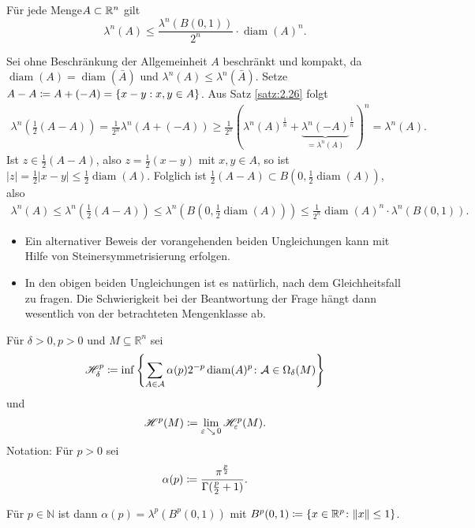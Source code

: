 \documentclass[a4paper,twoside,DIV15,BCOR12mm]{scrbook}
\newcommand{\HM}{\H}
\DeclareMathOperator{\diam}{diam}
\DeclareMathOperator{\downto}{\searrow}
\begin{document}
\begin{satz}
\label{satz:2.27}
Für jede Menge$A\subset \mathbb{R}^n$ gilt
\[
\lambda^n(A)  \le \frac{\lambda^n(B(0,1))}{2^n} \cdot \diam(A)^n.
\]
\end{satz}

\begin{beweis}
Sei ohne Beschränkung der Allgemeinheit $A$ beschränkt und kompakt, da $\diam(A) = \diam(\bar A)$ und $\lambda^n(A) \le \lambda^n(\bar A)$. Setze $A-A \da A + (-A) = \{ x-y : x,y\in A\}$. Aus Satz \ref{satz:2.26} folgt
\begin{align*}
\lambda^n(\frac12(A-A)) = \frac1{2^n} \lambda^n(A + (-A)) \ge \frac 1{2^n} \left(\lambda^n(A)^{\frac1n} + {\underbrace{\lambda^n(-A)}_{=\lambda^n(A)}}^{\frac1n}\right)^n = \lambda^n(A).
\end{align*}
Ist $z\in\frac12(A-A)$, also $z=\frac12(x-y)$ mit $x,y\in A$, so ist $|z| = \frac 12 |x-y| \le \frac12 \diam(A)$. Folglich ist $\frac12(A-A) \subset B(0,\frac12\diam(A))$, also
\begin{align*}
\lambda^n(A) \le \lambda^n(\frac12(A-A)) \le \lambda^n(B(0,\frac12\diam(A))) \le \frac1{2^n} \diam(A)^n \cdot \lambda^n(B(0,1)).
\end{align*}
\end{beweis}

\begin{bemerkung}
\begin{itemize}
\item Ein alternativer Beweis der vorangehenden beiden Ungleichungen kann mit Hilfe 
von Steinersymmetrisierung erfolgen.
\item In den obigen beiden Ungleichungen ist es natürlich, nach dem Gleichheitsfall 
zu fragen. Die Schwierigkeit bei der Beantwortung der Frage hängt dann wesentlich von 
der betrachteten Mengenklasse ab.
\end{itemize}
\end{bemerkung}

\begin{definition}
Für \(\delta > 0, p>0\) und \(M \subseteq \mathbb R^n\) sei
\[
\HM^p_\delta \da \inf\left\{ \sum_{A\in\mathcal A} \alpha(p) 2^{-p} \diam(A)^p \colon \mathcal A \in \Omega_\delta(M) \right\}
\]
und
\[
\HM^p(M) \da \lim_{\varepsilon\downto0} \HM^p_\varepsilon(M).
\]
Notation: Für \(p>0\) sei
\[
\alpha(p) \da \frac{\pi^{\frac{p}2}}{\Gamma(\frac{p}2+1)} .
\]
\end{definition}

Für $p\in\mathbb{N}$ ist dann  \(\alpha(p) = \lambda^p(B^p(0,1))\) mit \(B^p(0,1) \da \{ x \in \mathbb R^p \colon \|x\| \leq 1 \}\).
\end{document}
